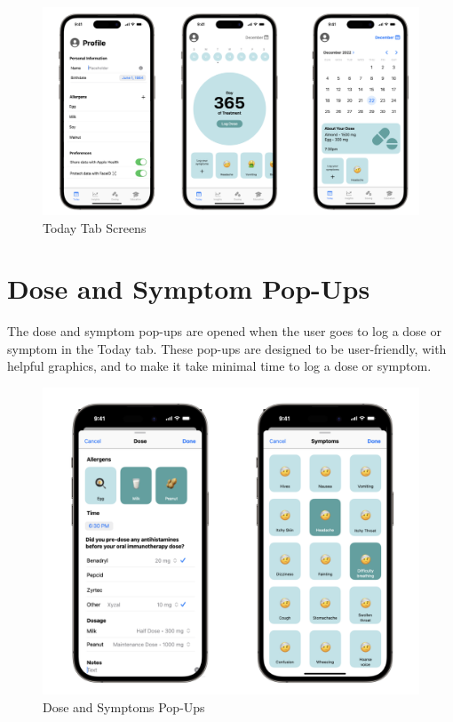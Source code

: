 \begin{figure}[H]
    \centering
    \includegraphics[width=1\linewidth]{thesis//chapters//images/todayTabScreens.png}
    \caption{Today Tab Screens}
    \label{fig:today-tab-screens}
\end{figure}

\section{Dose and Symptom Pop-Ups}

The dose and symptom pop-ups are opened when the user goes to log a dose or symptom in the Today tab. These pop-ups are designed to be user-friendly, with helpful graphics, and to make it take minimal time to log a dose or symptom.

\begin{figure}[H]
    \centering
    \includegraphics[width=0.7\linewidth]{thesis//chapters//images/doseAndSymptomPopUps.png}
    \caption{Dose and Symptoms Pop-Ups}
    \label{fig:dose-and-symptom-pop-ups}
\end{figure}

